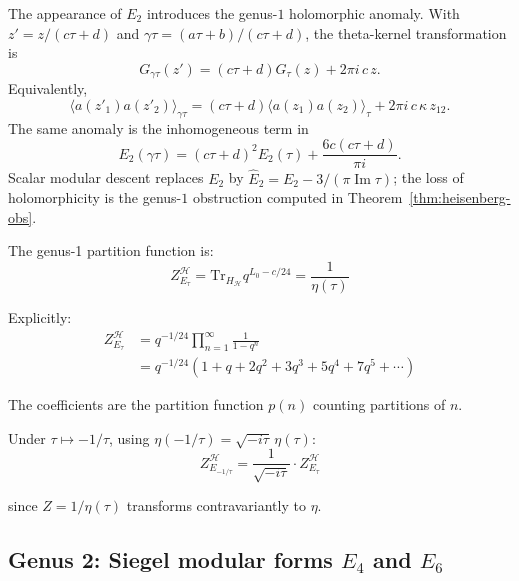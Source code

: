 \begin{remark}\label{rem:E2-holomorphic-anomaly}
The appearance of $E_2$ introduces the genus-$1$ holomorphic
anomaly. With $z'=z/(c\tau+d)$ and
$\gamma\tau=(a\tau+b)/(c\tau+d)$, the theta-kernel transformation is
\begin{equation}
G_{\gamma\tau}(z')
=(c\tau+d)G_\tau(z)+2\pi i\,c\,z .
\end{equation}
Equivalently,
\[
\langle a(z'_1)a(z'_2)\rangle_{\gamma\tau}
=(c\tau+d)\langle a(z_1)a(z_2)\rangle_\tau
+2\pi i\,c\,\kappa\,z_{12}.
\]
The same anomaly is the inhomogeneous term in
\[
E_2(\gamma\tau)
=(c\tau+d)^2E_2(\tau)
+\frac{6c(c\tau+d)}{\pi i}.
\]
Scalar modular descent replaces $E_2$ by
$\widehat{E}_2=E_2-3/(\pi\operatorname{Im}\tau)$; the loss of
holomorphicity is the genus-$1$ obstruction computed in
Theorem~\ref{thm:heisenberg-obs}.
\end{remark}

\begin{computation}\label{comp:heisenberg-partition-g1}
The genus-1 partition function is:
\begin{equation}
Z_{E_\tau}^{\mathcal{H}} = \text{Tr}_{H_{\mathcal{H}}} q^{L_0 - c/24}
= \frac{1}{\eta(\tau)}
\end{equation}

Explicitly:
\begin{align}
Z_{E_\tau}^{\mathcal{H}} &= q^{-1/24} \prod_{n=1}^{\infty} \frac{1}{1 - q^n} \\
&= q^{-1/24}(1 + q + 2q^2 + 3q^3 + 5q^4 + 7q^5 + \cdots)
\end{align}

The coefficients are the partition function $p(n)$ counting partitions of $n$.

Under $\tau \mapsto -1/\tau$, using $\eta(-1/\tau) = \sqrt{-i\tau}\,\eta(\tau)$:
\[Z_{E_{-1/\tau}}^{\mathcal{H}} = \frac{1}{\sqrt{-i\tau}} \cdot Z_{E_\tau}^{\mathcal{H}}\]

since $Z = 1/\eta(\tau)$ transforms contravariantly to $\eta$.
\end{computation}

\subsection{\texorpdfstring{Genus 2: Siegel modular forms $E_4$ and $E_6$}{Genus 2: Siegel modular forms E 4 and E 6}}
\label{subsec:heisenberg-genus-two}

